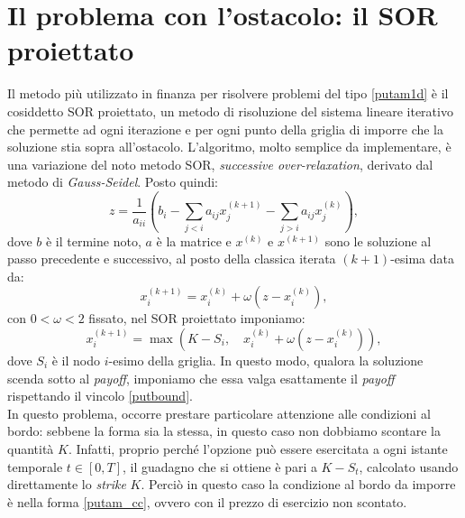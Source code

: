 \documentclass[a4paper,10pt]{report}
\theoremstyle{plain}
\theoremstyle{definition}
\theoremstyle{remark}
\begin{document}
\section{Il problema con l'ostacolo: il SOR proiettato}
Il metodo pi\`u utilizzato in finanza per risolvere problemi del tipo \eqref{putam1d}  \`e il cosiddetto SOR proiettato, un metodo di risoluzione del sistema lineare iterativo che permette ad ogni iterazione e per ogni punto della griglia di imporre che la soluzione stia sopra all'ostacolo. L'algoritmo, molto semplice da implementare, \`e una variazione del noto metodo SOR, \emph{successive over-relaxation}, derivato dal metodo di \emph{Gauss-Seidel}. Posto quindi: $$z=\frac{1}{a_{ii}}\left(b_i-\sum_{j<i}a_{ij}x_j^{(k+1)}-\sum_{j>i}a_{ij}x_j^{(k)}\right),$$dove $b$ \`e il termine noto, $a$ \`e la matrice e $x^{(k)}$ e $x^{(k+1)}$ sono le soluzione al passo precedente e successivo, al posto della classica iterata $(k+1)$-esima data da: $$x_i^{(k+1)}=x_i^{(k)}+\omega(z-x_i^{(k)}),$$con $0<\omega<2$ fissato, nel SOR proiettato imponiamo: $$x_i^{(k+1)}=\max\left(K-S_i,\quad x_i^{(k)}+\omega(z-x_i^{(k)})\right),$$dove $S_i$ \`e il nodo $i$-esimo della griglia. In questo modo, qualora la soluzione scenda sotto al \emph{payoff}, imponiamo che essa valga esattamente il \emph{payoff} rispettando il vincolo \eqref{putbound}.\\
In questo problema, occorre prestare particolare attenzione alle condizioni al bordo: sebbene la forma sia la stessa, in questo caso non dobbiamo scontare la quantità $K$. Infatti, proprio perché l'opzione può essere esercitata a ogni istante temporale $t\in[0, T]$, il guadagno che si ottiene è pari a $K-S_t$, calcolato usando direttamente lo \emph{strike} $K$. Perci\`o in questo caso la condizione al bordo da imporre \`e nella forma \ref{putam_cc}, ovvero con il prezzo di esercizio non scontato.
\end{document}
